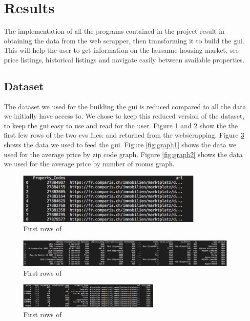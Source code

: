 \documentclass[main]{subfiles}
\begin{document}
\section{Results}
The implementation of all the programs contained in the project result in obtaining the data from the web scrapper,
then transforming it to build the \ac{gui}.
This will help the user to get information on the lausanne housing market, see price listings, historical listings and navigate easily between available properties.

\subsection{Dataset}
The dataset we used for the building the \ac{gui} is reduced compared to all the data we initially have access to. 
We chose to keep this reduced version of the dataset, to keep the \ac{gui} easy to use and read for the user. 
Figure \ref{fig:propcodes} and \ref{fig:propdetails} show the the first few rows of the two cvs files:  and  returned from the webscrapping.
Figure \ref{fig:dataxlsx} shows the data we used to feed the \ac{gui}.
Figure \ref{fig:graph1} shows the data we used for the average price by zip code graph.
Figure \ref{fig:graph2} shows the data we used for the average price by number of rooms graph.

\begin{figure}[htbp]
    \centerline{
        \includegraphics[width = 92mm]{prog_13.png}}
    \caption{First rows of }
    \label{fig:propcodes}
\end{figure}

\begin{figure}[htbp]
    \centerline{
        \includegraphics[width = 110mm]{prog_14.png}}
    \caption{First rows of }
    \label{fig:propdetails}
\end{figure}

\begin{figure}[htbp]
    \centerline{
        \includegraphics[width = 70mm]{prog_15.png}}
    \caption{First rows of }
    \label{fig:dataxlsx}
\end{figure}
\end{document}
